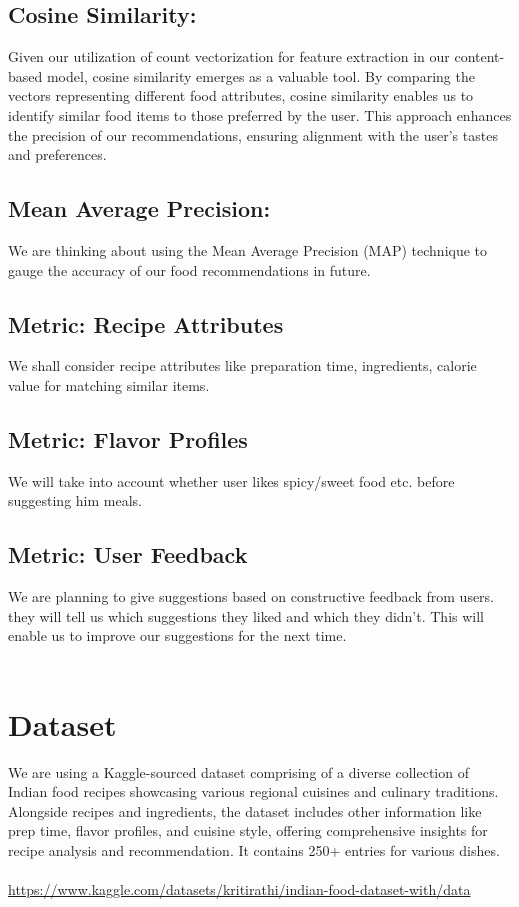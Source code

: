 \documentclass[conference]{IEEEtran}
\begin{document}
\subsection{Cosine Similarity:} 
Given our utilization of count vectorization for feature extraction in our content-based model, cosine similarity emerges as a valuable tool. By comparing the vectors representing different food attributes, cosine similarity enables us to identify similar food items to those preferred by the user. This approach enhances the precision of our recommendations, ensuring alignment with the user's tastes and preferences.
\\
\subsection{Mean Average Precision:}
We are thinking about using the Mean Average Precision (MAP) technique to gauge the accuracy of our food recommendations in future.
\\
\subsection{Metric: Recipe Attributes}
We shall consider recipe attributes like preparation time, ingredients, calorie value for matching similar items.
\\
\subsection{Metric: Flavor Profiles}
We will take into account whether user likes spicy/sweet food etc. before suggesting him meals.
\\
\subsection{Metric: User Feedback}
We are planning to give suggestions based on constructive feedback from users. they will tell us which suggestions they liked and which they didn't. This will enable us to improve our suggestions for the next time.
\\\\
\section{Dataset}
We are using a Kaggle-sourced dataset comprising of a diverse collection of Indian food recipes showcasing various regional cuisines and culinary traditions. Alongside recipes and ingredients, the dataset includes other information like prep time, flavor profiles, and cuisine style, offering comprehensive insights for recipe analysis and recommendation.
It contains 250+ entries for various dishes. 
\\\\
\url{https://www.kaggle.com/datasets/kritirathi/indian-food-dataset-with/data}
\\\\
\end{document}

